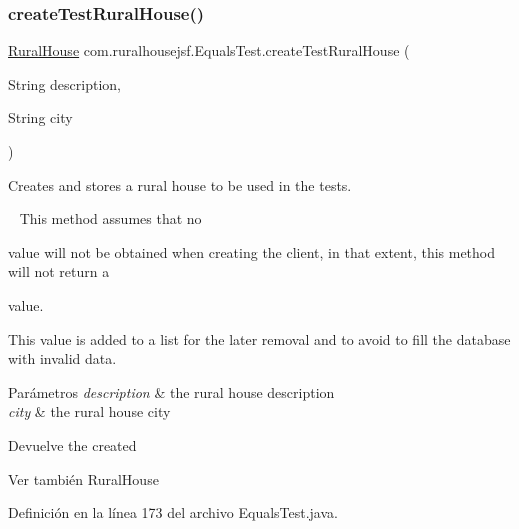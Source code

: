 \subsubsection{\texorpdfstring{createTestRuralHouse()}{createTestRuralHouse()}}
{\footnotesize\ttfamily \mbox{\hyperlink{classcom_1_1ruralhousejsf_1_1domain_1_1_rural_house}{Rural\+House}} com.\+ruralhousejsf.\+Equals\+Test.\+create\+Test\+Rural\+House (\begin{DoxyParamCaption}\item[{String}]{description,  }\item[{String}]{city }\end{DoxyParamCaption})\hspace{0.3cm}{\ttfamily [private]}}



Creates and stores a rural house to be used in the tests. 

~\newline
 This method assumes that no
\begin{DoxyCode}{0}
\DoxyCodeLine{\textcolor{keyword}{null} }
\end{DoxyCode}
 value will not be obtained when creating the client, in that extent, this method will not return a 
\begin{DoxyCode}{0}
\DoxyCodeLine{\textcolor{keyword}{null} }
\end{DoxyCode}
 value. 

This value is added to a list for the later removal and to avoid to fill the database with invalid data.


\begin{DoxyParams}{Parámetros}
{\em description} & the rural house description \\
\hline
{\em city} & the rural house city\\
\hline
\end{DoxyParams}
\begin{DoxyReturn}{Devuelve}
the created
\begin{DoxyCode}{0}
\end{DoxyCode}

\end{DoxyReturn}
\begin{DoxySeeAlso}{Ver también}
Rural\+House 
\end{DoxySeeAlso}


Definición en la línea 173 del archivo Equals\+Test.\+java.

\mbox{\label{classcom_1_1ruralhousejsf_1_1_equals_test_a74a69f394f6e76a2f557132edbc2ea00}} 
